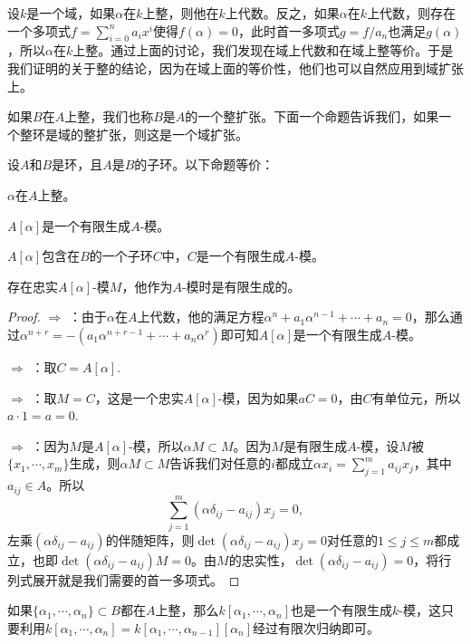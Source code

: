 设$k$是一个域，如果$\alpha$在$k$上整，则他在$k$上代数。反之，如果$\alpha$在$k$上代数，则存在一个多项式$f=\sum_{i=0}^na_ix^i$使得$f(\alpha)=0$，此时首一多项式$g=f/a_n$也满足$g(\alpha)$，所以$\alpha$在$k$上整。通过上面的讨论，我们发现在域上代数和在域上整等价。于是我们证明的关于整的结论，因为在域上面的等价性，他们也可以自然应用到域扩张上。

如果$B$在$A$上整，我们也称$B$是$A$的一个整扩张。下面一个命题告诉我们，如果一个整环是域的整扩张，则这是一个域扩张。

\begin{pro}\label{p2:1}
	设$A$和$B$是环，且$A$是$B$的子环。以下命题等价：
	\begin{compactenum}[~~~(1)]
		\item $\alpha$在$A$上整。
		\item $A[\alpha]$是一个有限生成$A$-模。
		\item $A[\alpha]$包含在$B$的一个子环$C$中，$C$是一个有限生成$A$-模。
		\item 存在忠实$A[\alpha]$-模$M$，他作为$A$-模时是有限生成的。
	\end{compactenum}
\end{pro}	

\begin{proof} 
	 $\Rightarrow$  ：由于$\alpha$在$A$上代数，他的满足方程$\alpha^n+a_1\alpha^{n-1}+\cdots+a_n=0$，那么通过$\alpha^{n+r}=-(a_1\alpha^{n+r-1}+\cdots+a_n\alpha^r)$即可知$A[\alpha]$是一个有限生成$A$-模。

	 $\Rightarrow$  ：取$C=A[\alpha]$.

	 $\Rightarrow$  ：取$M=C$，这是一个忠实$A[\alpha]$-模，因为如果$aC=0$，由$C$有单位元，所以$a\cdot 1=a=0$.

	 $\Rightarrow$  ：因为$M$是$A[\alpha]$-模，所以$\alpha M\subset M$。因为$M$是有限生成$A$-模，设$M$被$\{x_1,\cdots,x_m\}$生成，则$\alpha M\subset M$告诉我们对任意的$i$都成立$\alpha x_i=\sum_{j=1}^m a_{ij} x_j$，其中$a_{ij}\in A$。所以
	\[
		\sum_{j=1}^m (\alpha\delta_{ij} -a_{ij})x_j=0,
	\]
	左乘$(\alpha\delta_{ij} -a_{ij})$的伴随矩阵，则$\det(\alpha\delta_{ij} -a_{ij})x_j=0$对任意的$1\leq j \leq m$都成立，也即$\det(\alpha\delta_{ij} -a_{ij})M=0$。由$M$的忠实性，$\det(\alpha\delta_{ij} -a_{ij})=0$，将行列式展开就是我们需要的首一多项式。
\end{proof}

如果$\{\alpha_1,\cdots,\alpha_n\}\subset B$都在$A$上整，那么$k[\alpha_1,\cdots,\alpha_n]$也是一个有限生成$k$-模，这只要利用$k[\alpha_1,\cdots,\alpha_n]=k[\alpha_1,\cdots,\alpha_{n-1}][\alpha_n]$经过有限次归纳即可。

